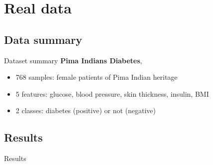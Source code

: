 \section{Real data}

\subsection{Data summary}

\begin{frame}{Dataset summary}
  \textbf{Pima Indians Diabetes}, \cite{smith1988}
  \begin{itemize}
    \item 768 samples: female patients of Pima Indian heritage
    \item 5 features: glucose, blood pressure, skin thickness, insulin, BMI
    \item 2 classes: diabetes (positive) or not (negative)
  \end{itemize}

  \note{ }

\end{frame}

\subsection{Results}

\begin{frame}{Results}
  \begin{table}[!htbp]
    \centering
    \caption{Results for 10-fold cross-validation}
  \end{table}

  \note{ }

\end{frame}
